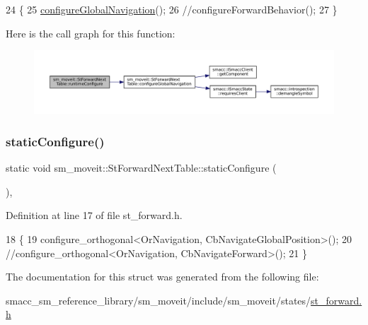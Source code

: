 \begin{DoxyCode}
24   \{
25     \hyperlink{structsm__moveit_1_1StForwardNextTable_ac3b63f25fad5cecd8faa51b427719d07}{configureGlobalNavigation}();
26     \textcolor{comment}{//configureForwardBehavior();}
27   \}
\end{DoxyCode}
Here is the call graph for this function\+:
\nopagebreak
\begin{figure}[H]
\begin{center}
\leavevmode
\includegraphics[width=350pt]{structsm__moveit_1_1StForwardNextTable_a4f6c466efdb91b0eb9aaee71f87a4fc4_cgraph}
\end{center}
\end{figure}
\mbox{\label{structsm__moveit_1_1StForwardNextTable_a2f28979d2a049e53b91802421771bcfb}} 
\subsubsection{\texorpdfstring{static\+Configure()}{staticConfigure()}}
{\footnotesize\ttfamily static void sm\+\_\+moveit\+::\+St\+Forward\+Next\+Table\+::static\+Configure (\begin{DoxyParamCaption}{ }\end{DoxyParamCaption})\hspace{0.3cm}{\ttfamily [inline]}, {\ttfamily [static]}}



Definition at line 17 of file st\+\_\+forward.\+h.


\begin{DoxyCode}
18   \{
19      configure\_orthogonal<OrNavigation, CbNavigateGlobalPosition>();
20     \textcolor{comment}{//configure\_orthogonal<OrNavigation, CbNavigateForward>();}
21   \}
\end{DoxyCode}


The documentation for this struct was generated from the following file\+:\begin{DoxyCompactItemize}
\item 
smacc\+\_\+sm\+\_\+reference\+\_\+library/sm\+\_\+moveit/include/sm\+\_\+moveit/states/\hyperlink{st__forward_8h}{st\+\_\+forward.\+h}\end{DoxyCompactItemize}
